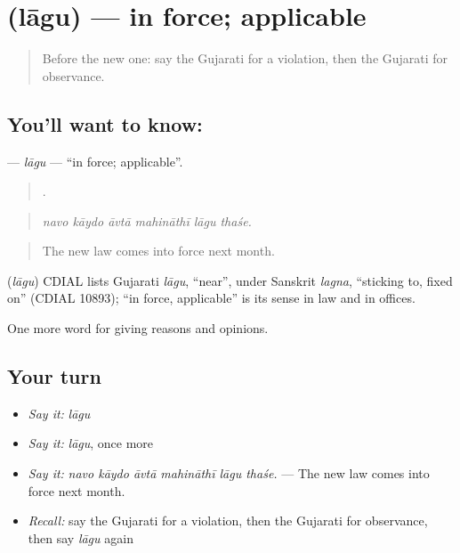 \section[\texorpdfstring{\gu{લાગુ} (lāgu)}{લાગુ (lāgu)}]{ (lāgu) — in force; applicable}

\label{lesson:GU-C347-lagu}



\begin{quote}
Before the new one: say the Gujarati for a violation, then the Gujarati for observance.
\end{quote}

\subsection*{You'll want to know: }
\textbf{} — \emph{lāgu} — \textquotedblleft{}in force; applicable\textquotedblright{}.

\begin{quote}
     .
\end{quote}

\begin{quote}
\emph{navo kāydo āvtā mahināthī lāgu thaśe.}
\end{quote}

\begin{quote}
The new law comes into force next month.
\end{quote}

\begin{cousinweb}
\textbf{} (\emph{lāgu}) CDIAL lists Gujarati \emph{lāgu}, \textquotedblleft{}near\textquotedblright{}, under Sanskrit \emph{lagna}, \textquotedblleft{}sticking to, fixed on\textquotedblright{} (CDIAL 10893); \textquotedblleft{}in force, applicable\textquotedblright{} is its sense in law and in offices.
\end{cousinweb}

\begin{grammarlens}[title={What you've built}]
One more word for giving reasons and opinions.
\end{grammarlens}

\subsection*{Your turn}
\begin{itemize}
\raggedright
  \item \emph{Say it:} \emph{lāgu}
  \item \emph{Say it:} \emph{lāgu}, once more
  \item \emph{Say it:} \emph{navo kāydo āvtā mahināthī lāgu thaśe.} — The new law comes into force next month.
  \item \emph{Recall:} say the Gujarati for a violation, then the Gujarati for observance, then say \emph{lāgu} again
\end{itemize}

